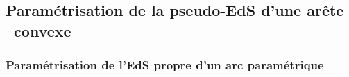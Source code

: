 \subsection{Paramétrisation de la pseudo-EdS d'une arête \brep\ convexe}%

\subsubsection{Paramétrisation de l'EdS propre d'un arc paramétrique}
\label{section:parametrisation_EdS_propre_courbe}

